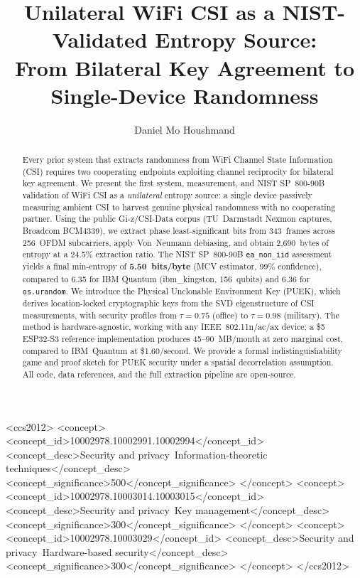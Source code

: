 \documentclass[sigconf,nonacm=false]{acmart}
\begin{document}
\title{Unilateral WiFi CSI as a NIST-Validated Entropy Source: \\
From Bilateral Key Agreement to Single-Device Randomness}

\author{Daniel Mo Houshmand}

\begin{abstract}
Every prior system that extracts randomness from WiFi Channel State Information (CSI) requires two cooperating endpoints exploiting channel reciprocity for bilateral key agreement.
We present the first system, measurement, and NIST SP~800-90B validation of WiFi CSI as a \emph{unilateral} entropy source: a single device passively measuring ambient CSI to harvest genuine physical randomness with no cooperating partner.
Using the public Gi-z/CSI-Data corpus (TU~Darmstadt Nexmon captures, Broadcom BCM4339), we extract phase least-significant bits from 343~frames across 256~OFDM subcarriers, apply Von~Neumann debiasing, and obtain 2,690~bytes of entropy at a 24.5\% extraction ratio.
The NIST SP~800-90B \texttt{ea\_non\_iid} assessment yields a final min-entropy of \textbf{5.50~bits/byte} (MCV estimator, 99\% confidence), compared to 6.35 for IBM Quantum (ibm\_kingston, 156~qubits) and 6.36 for \texttt{os.urandom}.
We introduce the Physical Unclonable Environment Key (PUEK), which derives location-locked cryptographic keys from the SVD eigenstructure of CSI measurements, with security profiles from $\tau=0.75$ (office) to $\tau=0.98$ (military).
The method is hardware-agnostic, working with any IEEE~802.11n/ac/ax device; a \$5 ESP32-S3 reference implementation produces 45--90~MB/month at zero marginal cost, compared to IBM~Quantum at \$1.60/second.
We provide a formal indistinguishability game and proof sketch for PUEK security under a spatial decorrelation assumption.
All code, data references, and the full extraction pipeline are open-source.
\end{abstract}

\begin{CCSXML}
<ccs2012>
<concept>
<concept_id>10002978.10002991.10002994</concept_id>
<concept_desc>Security and privacy~Information-theoretic techniques</concept_desc>
<concept_significance>500</concept_significance>
</concept>
<concept>
<concept_id>10002978.10003014.10003015</concept_id>
<concept_desc>Security and privacy~Key management</concept_desc>
<concept_significance>300</concept_significance>
</concept>
<concept>
<concept_id>10002978.10003029</concept_id>
<concept_desc>Security and privacy~Hardware-based security</concept_desc>
<concept_significance>300</concept_significance>
</concept>
</ccs2012>
\end{CCSXML}
\end{document}
